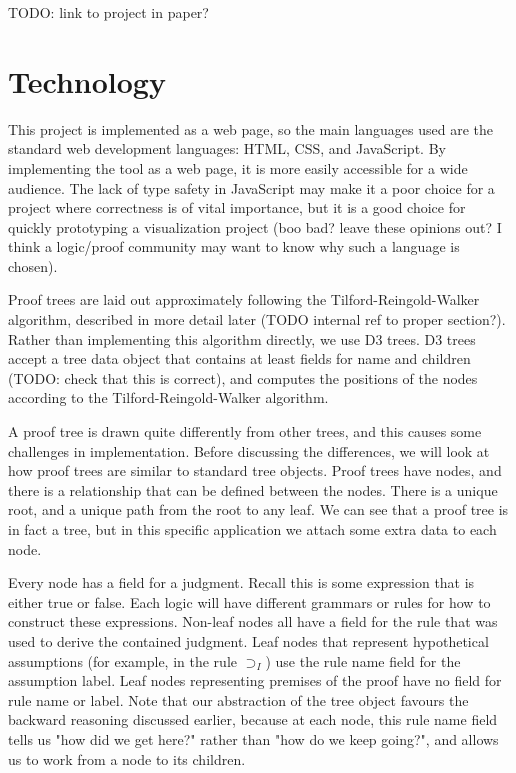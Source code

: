 \documentclass[conference]{IEEEtran}
\begin{document}
TODO: link to project in paper? \\


\section{Technology}

This project is implemented as a web page, so the main languages used are the standard web development languages: HTML, CSS, and JavaScript. By implementing the tool as a web page, it is more easily accessible for a wide audience. The lack of type safety in JavaScript may make it a poor choice for a project where correctness is of vital importance, but it is a good choice for quickly prototyping a visualization project (boo bad? leave these opinions out? I think a logic/proof community may want to know why such a language is chosen).

Proof trees are laid out approximately following the Tilford-Reingold-Walker algorithm, described in more detail later (TODO internal ref to proper section?). Rather than implementing this algorithm directly, we use D3 trees. D3 trees accept a tree data object that contains at least fields for name and children (TODO: check that this is correct), and computes the positions of the nodes according to the Tilford-Reingold-Walker algorithm.

A proof tree is drawn quite differently from other trees, and this causes some challenges in implementation. Before discussing the differences, we will look at how proof trees are similar to standard tree objects. Proof trees have nodes, and there is a relationship that can be defined between the nodes. There is a unique root, and a unique path from the root to any leaf. We can see that a proof tree is in fact a tree, but in this specific application we attach some extra data to each node.

Every node has a field for a judgment. Recall this is some expression that is either true or false. Each logic will have different grammars or rules for how to construct these expressions. Non-leaf nodes all have a field for the rule that was used to derive the contained judgment. Leaf nodes that represent hypothetical assumptions (for example, in the rule $\supset_I$) use the rule name field for the assumption label. Leaf nodes representing premises of the proof have no field for rule name or label. Note that our abstraction of the tree object favours the backward reasoning discussed earlier, because at each node, this rule name field tells us "how did we get here?" rather than "how do we keep going?", and allows us to work from a node to its children.
\end{document}
